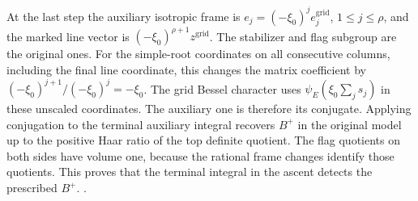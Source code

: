 At the last step the auxiliary isotropic frame is
\(e_j=(-\xi_0)^j e_j^{\mathrm{grid}}\), \(1\le j\le\rho\),
and the marked line vector is
\((-\xi_0)^{\rho+1}z^{\mathrm{grid}}\). The stabilizer and
flag subgroup are the original ones. For the simple-root
coordinates on all consecutive columns, including the final
line coordinate, this changes the matrix coefficient by
\((-\xi_0)^{j+1}/(-\xi_0)^j=-\xi_0\).
The grid Bessel character uses \(\psi_E(\xi_0\sum_j s_j)\)
in these unscaled coordinates. The auxiliary one is therefore
its conjugate. Applying conjugation to the terminal auxiliary
integral recovers \(B^+\) in the original model up to the
positive Haar ratio of the top definite quotient. The flag
quotients on both sides have volume one, because the rational
frame changes identify those quotients. This proves that the
terminal integral in the ascent detects the prescribed
\(B^+\).
.

